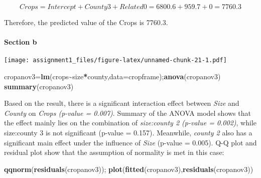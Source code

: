 \documentclass[
]{article}
\newenvironment{Shaded}{\begin{snugshade}}{\end{snugshade}}
\newcommand{\AttributeTok}[1]{\textcolor[rgb]{0.13,0.29,0.53}{#1}}
\newcommand{\FunctionTok}[1]{\textcolor[rgb]{0.13,0.29,0.53}{\textbf{#1}}}
\newcommand{\NormalTok}[1]{#1}
\newcommand{\OtherTok}[1]{\textcolor[rgb]{0.56,0.35,0.01}{#1}}
\newcommand{\SpecialCharTok}[1]{\textcolor[rgb]{0.81,0.36,0.00}{\textbf{#1}}}
\begin{document}
\[
Crops = Intercept + County3 + Related0 = 6800.6 + 959.7 + 0 = 7760.3
\]

Therefore, the predicted value of the Crops is 7760.3.

\paragraph{Section b}\label{section-b}

\begin{Shaded}
\end{Shaded}

\texttt{[image: assignment1\_files/figure-latex/unnamed-chunk-21-1.pdf]}

\begin{Shaded}
\begin{Highlighting}[]
\NormalTok{cropanov3}\OtherTok{=}\FunctionTok{lm}\NormalTok{(crops}\SpecialCharTok{\textasciitilde{}}\NormalTok{size}\SpecialCharTok{*}\NormalTok{county,}\AttributeTok{data=}\NormalTok{cropframe);}\FunctionTok{anova}\NormalTok{(cropanov3)}
\FunctionTok{summary}\NormalTok{(cropanov3)}
\end{Highlighting}
\end{Shaded}

Based on the result, there is a significant interaction effect between
\emph{Size} and \emph{County} on \emph{Crops (p-value = 0.007)}. Summary
of the ANOVA model shows that the effect mainly lies on the combination
of \emph{size:county 2 (p-value = 0.002)}, while size:county 3 is not
significant (p-value = 0.157). Meanwhile, \emph{county 2} also has a
significant main effect under the influence of \emph{Size} (p-value =
0.005). Q-Q plot and residual plot show that the assumption of normality
is met in this case:

\begin{Shaded}
\begin{Highlighting}[]
\FunctionTok{qqnorm}\NormalTok{(}\FunctionTok{residuals}\NormalTok{(cropanov3)); }\FunctionTok{plot}\NormalTok{(}\FunctionTok{fitted}\NormalTok{(cropanov3),}\FunctionTok{residuals}\NormalTok{(cropanov3))}
\end{Highlighting}
\end{Shaded}
\end{document}
